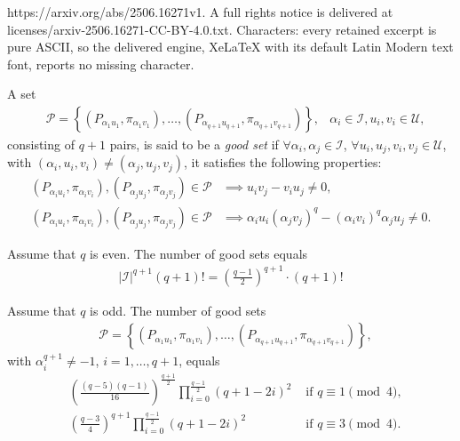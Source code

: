 \documentclass[10pt,a4paper]{amsart}
\def\cI{\mathcal I}
\def\cP{\mathcal P}
\def\cU{\mathcal U}
\begin{document}
https://arxiv.org/abs/2506.16271v1. A full rights notice is delivered at licenses/arxiv-2506.16271-CC-BY-4.0.txt. Characters: every retained excerpt is pure ASCII, so the delivered engine, XeLaTeX with its default Latin Modern text font, reports no missing character.
\begin{defin}\label{goodset}
    A set
\begin{align*}
& \cP = \left\{\left(P_{\alpha_{1} u_1}, \pi_{\alpha_{1} v_1}\right), \dots, \left(P_{\alpha_{{q+1}} u_{q+1}}, \pi_{\alpha_{{q+1}} v_{q+1}}\right)\right\}, & \alpha_{i} \in \cI, u_i, v_i \in \cU, 
\end{align*}
consisting of $q+1$ pairs, is said to be a {\em good set} if $\forall \alpha_{i}, \alpha_{j} \in \cI$, $\forall u_i, u_j, v_i, v_j \in \cU$, with $(\alpha_{i}, u_{i}, v_i) \ne (\alpha_{j}, u_j, v_j)$, it satisfies the following properties:
\begin{align}
\left(P_{\alpha_{i} u_i}, \pi_{\alpha_{i} v_i}\right), \left(P_{\alpha_{j} u_{j}}, \pi_{\alpha_{j} v_j}\right) \in \cP & \implies u_i v_j - v_i u_j \ne 0, \label{property1} \\
\left(P_{\alpha_{i} u_i}, \pi_{\alpha_{i} v_i}\right), \left(P_{\alpha_{j} u_{j}}, \pi_{\alpha_{j} v_{j}}\right) \in \cP & \implies \alpha_{i} u_i \left(\alpha_{j} v_{j}\right)^q - \left(\alpha_{i} v_i\right)^q \alpha_{j} u_{j} \ne 0. \label{property2}\end{align}
\end{defin}

\begin{prop}\label{prop:allgoodsetseven}
    Assume that $q$ is even. The number of good sets equals  
    \begin{align*}
    \lvert \cI \rvert^{q+1} (q+1)!=\left( \frac{q-1}{2} \right)^{q+1} \cdot (q+1)!
    \end{align*}
\end{prop}

\begin{cor}\label{cor:allgoodsetsodd}
Assume that $q$ is odd. The number of good sets 
\begin{align*}
& \cP = \left\{\left(P_{\alpha_{1} u_1}, \pi_{\alpha_{1} v_1}\right), \dots, \left(P_{\alpha_{{q+1}} u_{q+1}}, \pi_{\alpha_{{q+1}} v_{q+1}}\right)\right\},  
\end{align*}
with $\alpha_i^{q+1} \neq -1$, $i = 1, \dots, q+1$, equals  
    \begin{align*}
    & \left(\frac{(q-5)(q-1)}{16}\right)^{\frac{q+1}{2}} \prod_{i=0}^{\frac{q-1}{2}} \left(q+1-2i \right)^2 & \mbox{ if }q \equiv 1 \pmod{4}, \\ 
    & \left(\frac{q-3}{4}\right)^{q+1} \prod_{i=0}^{\frac{q-1}{2}} \left(q+1-2i \right)^2 & \mbox{ if } q \equiv 3 \pmod{4}. 
    \end{align*}
\end{cor}
\end{document}
